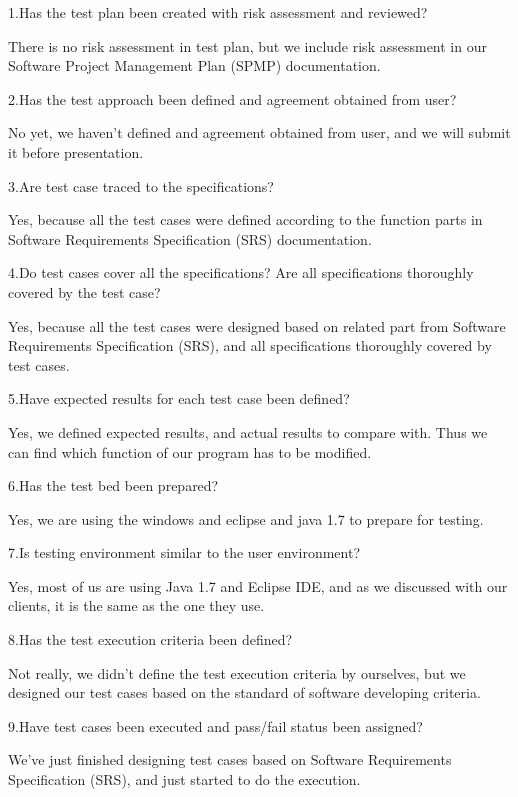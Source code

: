 \documentclass[12pt]{article}
\begin{document}
\begin{description}
\item{1.Has the test plan been created with risk assessment and reviewed?}
\item{There is no risk assessment in test plan, but we include risk assessment in our Software Project Management Plan (SPMP) documentation.}

\item{2.Has the test approach been defined and agreement obtained from user?}
\item{No yet, we haven't defined and agreement obtained from user, and we will submit it before presentation.}

\item{3.Are test case traced to the specifications?}
\item{Yes, because all the test cases were defined according to the function parts in Software Requirements Specification (SRS) documentation.}

\item{4.Do test cases cover all the specifications? Are all specifications thoroughly covered by the test case?}
\item{Yes, because all the test cases were designed based on related part from Software Requirements Specification (SRS), and all specifications thoroughly covered by test cases.}


\item{5.Have expected results for each test case been defined?}
\item{Yes, we defined expected results, and actual results to compare with. Thus we can find which function of our program has to be modified. }


\item{6.Has the test bed been prepared?}
\item{Yes, we are using the windows and eclipse and java 1.7 to prepare for testing. }


\item{7.Is testing environment similar to the user environment?}
\item{Yes, most of us are using Java 1.7 and Eclipse IDE, and as we discussed with our clients, it is the same as the one they use. }


\item{8.Has the test execution criteria been defined?}
\item{Not really, we didn't define the test execution criteria by ourselves, but we designed our test cases based on the standard of software developing criteria. }


\item{9.Have test cases been executed and pass/fail status been assigned?}
\item{We've just finished designing test cases based on Software Requirements Specification (SRS), and just started to do the execution. }

\end{description}
\end{document}

